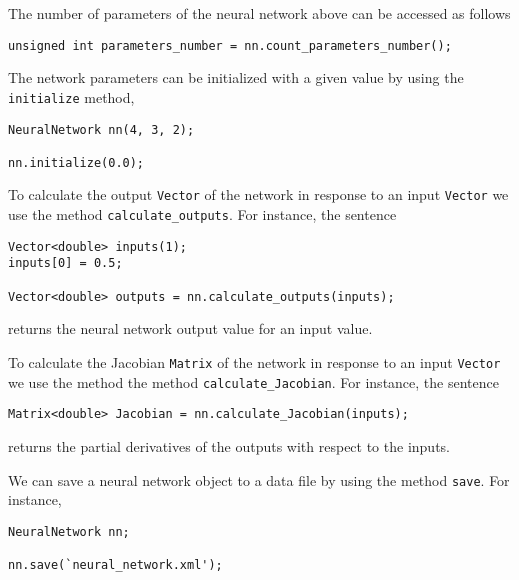 The number of parameters of the neural network above can be accessed as follows

\begin{lstlisting}
unsigned int parameters_number = nn.count_parameters_number();
\end{lstlisting}


The network parameters can be initialized with a given value by using the \lstinline"initialize" method, 

\begin{lstlisting}
NeuralNetwork nn(4, 3, 2);

nn.initialize(0.0);
\end{lstlisting}



To calculate the output \lstinline"Vector" of the network in
response to an input \lstinline"Vector" we use the method
\lstinline"calculate_outputs". For instance, the
sentence

\begin{lstlisting}
Vector<double> inputs(1); 
inputs[0] = 0.5;

Vector<double> outputs = nn.calculate_outputs(inputs);
\end{lstlisting}

\noindent returns the neural network output value for an input value.


To calculate the Jacobian \lstinline"Matrix" of the network in
response to an input \lstinline"Vector" we use the method  the
method \lstinline"calculate_Jacobian". For instance,
the sentence

\begin{lstlisting}
Matrix<double> Jacobian = nn.calculate_Jacobian(inputs);
\end{lstlisting}

\noindent returns the partial derivatives of the outputs with respect to the inputs.




We can save a neural network object to a data file by using the method \lstinline"save". For instance,

\begin{lstlisting}
NeuralNetwork nn;

nn.save(`neural_network.xml');
\end{lstlisting}

